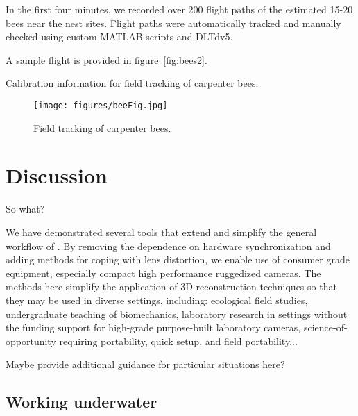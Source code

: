 \documentclass[fleqn,10pt]{wlpeerj}
\begin{document}
In the first four minutes, we recorded over 200 flight paths of the estimated 15-20 bees near the nest sites.  Flight paths were automatically tracked and manually checked using custom MATLAB scripts and DLTdv5.  

A sample flight is provided in figure~\ref{fig:bees2}.  

\begin{table}
\caption{Calibration information for field tracking of carpenter bees.}
\label{tab:bees1}
\end{table}

\begin{figure}
\texttt{[image: figures/beeFig.jpg]}
\caption{Field tracking of carpenter bees. }
\label{tab:bees2}
\end{figure}






  
\section*{Discussion}
So what?

We have demonstrated several tools that extend and simplify the general workflow of \citet{Theriault:2014}.  By removing the dependence on hardware synchronization and adding methods for coping with lens distortion, we enable use of consumer grade equipment, especially compact high performance ruggedized cameras.  The methods here simplify the application of 3D reconstruction techniques so that they may be used in diverse settings, including: ecological field studies, undergraduate teaching of biomechanics, laboratory research in settings without the funding support for high-grade purpose-built laboratory cameras, science-of-opportunity requiring portability, quick setup, and field portability... 

Maybe provide additional guidance for particular situations here?

\subsection*{Working underwater}
\end{document}
